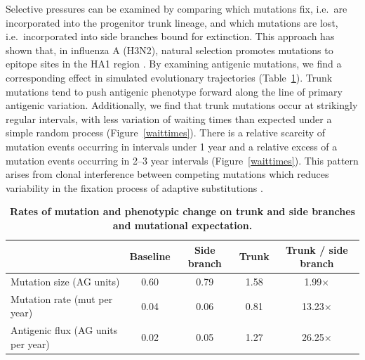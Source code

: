 \documentclass[11pt,oneside,letterpaper]{article}
\begin{document}
Selective pressures can be examined by comparing which mutations fix, i.e.\ are incorporated into the progenitor trunk lineage, and which mutations are lost, i.e.\ incorporated into side branches bound for extinction.  This approach has shown that, in influenza A (H3N2), natural selection promotes mutations to epitope sites in the HA1 region \cite{Bush99MBE,Wolf06}.  By examining antigenic mutations, we find a corresponding effect in simulated evolutionary trajectories (Table~\ref{mktable}).  Trunk mutations tend to push antigenic phenotype forward along the line of primary antigenic variation.  Additionally, we find that trunk mutations occur at strikingly regular intervals, with less variation of waiting times than expected under a simple random process (Figure~\ref{waittimes}).  There is a relative scarcity of mutation events occurring in intervals under 1 year and a relative excess of a mutation events occurring in 2--3 year intervals (Figure~\ref{waittimes}).  This pattern arises from clonal interference between competing mutations which reduces variability in the fixation process of adaptive substitutions \cite{Park07}.

\begin{table}[tb]
	\centering
	\caption{\textbf{Rates of mutation and phenotypic change on trunk and side branches and mutational expectation.}}
	\label{mktable}
	\begin{tabular*}{1.0\textwidth}{ l c c c c } 
	\hline
		 								& Baseline 	& Side branch 	& Trunk		& Trunk / side branch \\
	\hline				
	Mutation size (AG units)			& 0.60		& 0.79			& 1.58		& 1.99$\times$ \\
	Mutation rate (mut per year)		& 0.04		& 0.06			& 0.81		& 13.23$\times$ \\	
	Antigenic flux (AG units per year)	& 0.02		& 0.05			& 1.27		& 26.25$\times$ \\		
	\hline
	\end{tabular*}
\end{table}
\end{document}
